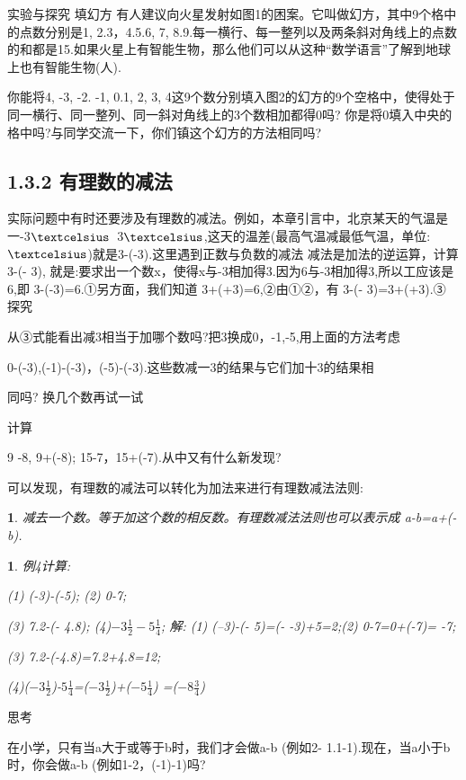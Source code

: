 \documentclass[UTF8]{article}
\newtheorem{propertory}{ }
\newtheorem{example}{ }
\begin{document}
实验与探究
填幻方
有人建议向火星发射如图1的困案。它叫做幻方，其中9个格中的点数分别是1, 2.3，4.5.6, 7, 8.9.每一横行、每一整列以及两条斜对角线上的点数的和都是15.如果火星上有智能生物，那么他们可以从这种“数学语言”了解到地球上也有智能生物(人).

你能将4, -3, -2. -1, 0.1, 2, 3, 4这9个数分别填入图2的幻方的9个空格中，使得处于同一横行、同一整列、同一斜对角线上的3个数相加都得0吗?
你是将0填入中央的格中吗?与同学交流一下，你们镇这个幻方的方法相同吗?

\subsection*{1.3.2 有理数的减法}
实际问题中有时还要涉及有理数的减法。例如，本章引言中，北京某天的气温是一-3${\textcelsius }$~3${\textcelsius}$,这天的温差(最高气温减最低气温，单位:${\textcelsius }$)就是3-(-3).这里遇到正数与负数的减法
减法是加法的逆运算，计算3-(- 3), 就是:要求出一个数x，使得x与-3相加得3.因为6与-3相加得3,所以工应该是6,即
3-(-3)=6.①另方面，我们知道
3+(+3)=6,②由①②，有
3-(- 3)=3+(+3).③
探究

从③式能看出减3相当于加哪个数吗?把3换成0，-1,-5,用上面的方法考虑

0-(-3),(-1)-(-3)，(-5)-(-3).这些数减一3的结果与它们加十3的结果相

同吗?  换几个数再试一试

计算

9 -8, 9+(-8); 15-7，15+(-7).从中又有什么新发现?

可以发现，有理数的减法可以转化为加法来进行有理数减法法则:

\begin{propertory}
减去一个数。等于加这个数的相反数。有理数减法法则也可以表示成
a-b=a+(-b).
\end{propertory}

\begin{example}
例4计算:

(1) (-3)-(-5);  (2) 0-7;

(3) 7.2-(- 4.8);  (4)$-3\frac{1}{2}-5\frac{1}{4}$;
解: 
(1) (--3)-(- 5)=(- -3)+5=2;(2) 0-7=0+(-7)= -7;

(3) 7.2-(-4.8)=7.2+4.8=12;

(4)($-3\frac{1}{2}$)-$5\frac{1}{4}$=($-3\frac{1}{2}$)+($-5\frac{1}{4}$) =($-8\frac{3}{4}$)
\end{example}

思考

在小学，只有当a大于或等于b时，我们才会做a-b (例如2- 1.1-1).现在，当a小于b时，你会做a-b (例如1-2，(-1)-1)吗?
\end{document}
